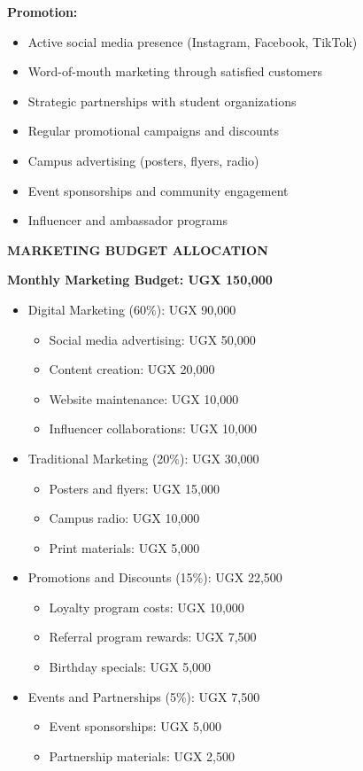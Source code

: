 \textbf{Promotion:}
\begin{itemize}[leftmargin=2em]
    \item Active social media presence (Instagram, Facebook, TikTok)
    \item Word-of-mouth marketing through satisfied customers
    \item Strategic partnerships with student organizations
    \item Regular promotional campaigns and discounts
    \item Campus advertising (posters, flyers, radio)
    \item Event sponsorships and community engagement
    \item Influencer and ambassador programs
\end{itemize}

\vspace{1em}

\textbf{MARKETING BUDGET ALLOCATION}

\textbf{Monthly Marketing Budget: UGX 150,000}

\begin{itemize}[leftmargin=2em]
    \item Digital Marketing (60\%): UGX 90,000
    \begin{itemize}
        \item Social media advertising: UGX 50,000
        \item Content creation: UGX 20,000
        \item Website maintenance: UGX 10,000
        \item Influencer collaborations: UGX 10,000
    \end{itemize}
    
    \item Traditional Marketing (20\%): UGX 30,000
    \begin{itemize}
        \item Posters and flyers: UGX 15,000
        \item Campus radio: UGX 10,000
        \item Print materials: UGX 5,000
    \end{itemize}
    
    \item Promotions and Discounts (15\%): UGX 22,500
    \begin{itemize}
        \item Loyalty program costs: UGX 10,000
        \item Referral program rewards: UGX 7,500
        \item Birthday specials: UGX 5,000
    \end{itemize}
    
    \item Events and Partnerships (5\%): UGX 7,500
    \begin{itemize}
        \item Event sponsorships: UGX 5,000
        \item Partnership materials: UGX 2,500
    \end{itemize}
\end{itemize}

